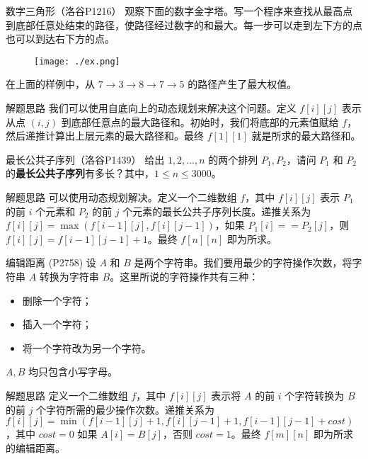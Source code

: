 \documentclass{beamer}
\begin{document}
\begin{frame}{数字三角形（洛谷P1216）}
    观察下面的数字金字塔。写一个程序来查找从最高点到底部任意处结束的路径，使路径经过数字的和最大。每一步可以走到左下方的点也可以到达右下方的点。
    \begin{figure}
        \centering
        \texttt{[image: ./ex.png]}
    \end{figure}
    在上面的样例中，从 $7 \rightarrow 3 \rightarrow 8 \rightarrow 7 \rightarrow 5$ 的路径产生了最大权值。
\end{frame}

\begin{frame}{解题思路}
    我们可以使用自底向上的动态规划来解决这个问题。定义 $f[i][j]$ 表示从点 $(i, j)$ 到底部任意点的最大路径和。初始时，我们将底部的元素值赋给 $f$，然后递推计算出上层元素的最大路径和。最终 $f[1][1]$ 就是所求的最大路径和。
\end{frame}

\begin{frame}{最长公共子序列（洛谷P1439）}
    给出 $1, 2, \dots, n$ 的两个排列 $P_1, P_2$，请问 $P_1$ 和 $P_2$ 的\textbf{最长公共子序列}有多长？其中，$1\leq n\leq 3000$。
\end{frame}

\begin{frame}{解题思路}
    可以使用动态规划解决。定义一个二维数组 $f$，其中 $f[i][j]$ 表示 $P_1$ 的前 $i$ 个元素和 $P_2$ 的前 $j$ 个元素的最长公共子序列长度。递推关系为 $f[i][j] = \max(f[i-1][j], f[i][j-1])$，如果 $P_1[i] == P_2[j]$，则 $f[i][j] = f[i-1][j-1] + 1$。最终 $f[n][n]$ 即为所求。
\end{frame}

\begin{frame}{编辑距离 (P2758)}
    设 $A$ 和 $B$ 是两个字符串。我们要用最少的字符操作次数，将字符串 $A$ 转换为字符串 $B$。这里所说的字符操作共有三种：
    \begin{itemize}
        \item 删除一个字符；
        \item 插入一个字符；
        \item 将一个字符改为另一个字符。
    \end{itemize}
    $A, B$ 均只包含小写字母。
\end{frame}

\begin{frame}{解题思路}
    定义一个二维数组 $f$，其中 $f[i][j]$ 表示将 $A$ 的前 $i$ 个字符转换为 $B$ 的前 $j$ 个字符所需的最少操作次数。递推关系为 $f[i][j] = \min(f[i-1][j] + 1, f[i][j-1] + 1, f[i-1][j-1] + cost)$，其中 $cost = 0$ 如果 $A[i] = B[j]$，否则 $cost = 1$。最终 $f[m][n]$ 即为所求的编辑距离。
\end{frame}
\end{document}
